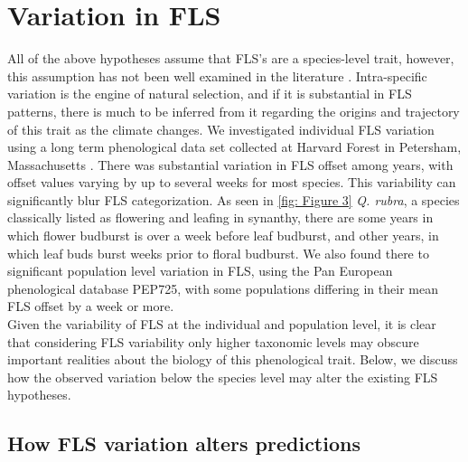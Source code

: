 \documentclass[12pt]{article}\usepackage[]{graphicx}\usepackage[]{color}
\begin{document}
\section*{Variation in FLS}
 \indent\indent All of the above hypotheses assume that FLS's are a species-level trait, however, this assumption has not been well examined in the literature \citep{Gougherty2018}. Intra-specific variation is the engine of natural selection, and if it is substantial in FLS patterns, there is much to be inferred from it regarding the origins and trajectory of this trait as the climate changes.
 We investigated individual FLS variation using a long term phenological data set collected at Harvard Forest in Petersham, Massachusetts \citep{OKeefe2015}. There was substantial variation in FLS offset among years, with offset values varying by up to several weeks for most species.  This variability  can significantly blur FLS categorization. As seen in \ref{fig: Figure 3} \textit{Q. rubra}, a species classically listed as flowering and leafing in synanthy, there are some years in which flower budburst is over a week before leaf budburst, and other years, in which leaf buds burst weeks prior to floral budburst. We also found there to significant population level variation in FLS, using the Pan European phenological database PEP725\citep{PEP725}, with some populations differing in their mean FLS offset by a week or more.\\
\indent Given the variability of FLS at the individual and population level, it is clear that considering FLS variability only higher taxonomic levels may obscure important realities about the biology of this phenological trait. Below, we discuss how the observed variation below the species level may alter the existing FLS hypotheses.

\subsection*{How FLS variation alters predictions}
\end{document}
